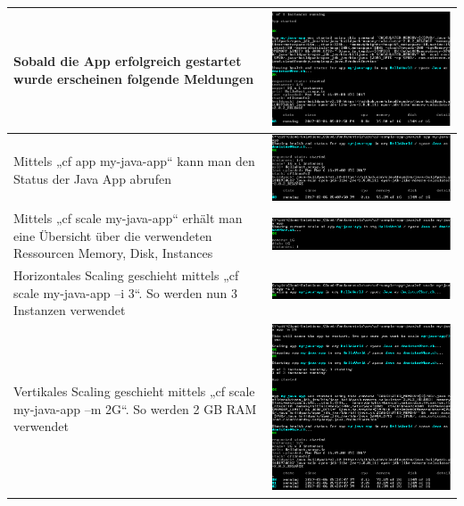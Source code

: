 \begin{longtable}{| p{5cm} | p{11cm} |}
Sobald die App erfolgreich gestartet wurde erscheinen folgende Meldungen &\includegraphics[width=0.65\columnwidth, valign=T]{images/image13.png} \\ \hline 
Mittels „cf app my-java-app“ kann man den Status der Java App abrufen &\includegraphics[width=0.65\columnwidth, valign=T]{images/image14.png} \\ \hline
Mittels „cf scale my-java-app“ erhält man eine Übersicht über die verwendeten Ressourcen Memory, Disk, Instances 
&\includegraphics[width=0.65\columnwidth, valign=T]{images/image15.png} \\ \hline
Horizontales Scaling geschieht mittels „cf scale my-java-app –i 3“. So werden nun 3 Instanzen verwendet 
&\includegraphics[width=0.65\columnwidth, valign=T]{images/image16.png} \\ \hline
Vertikales Scaling geschieht mittels „cf scale my-java-app –m 2G“. So werden 2 GB RAM verwendet &\includegraphics[width=0.65\columnwidth, valign=T]{images/image17.png} \\ \hline

\end{longtable}
